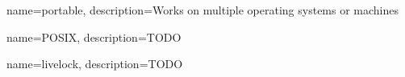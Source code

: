 {
    name=portable,
    description={Works on multiple operating systems or machines}
}

{
    name=POSIX,
    description={TODO}
}

{
	name=livelock,
	description={TODO}
}